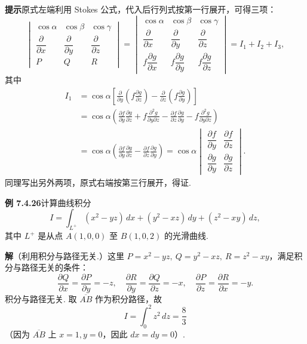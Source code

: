 \documentclass[UTF8,12pt,a4paper,fontset=fandol]{ctexart}
\begin{document}
\noindent\textbf{提示}\quad 原式左端利用 Stokes 公式，代入后行列式按第一行展开，可得三项：
\[
\begin{vmatrix}
\cos\alpha & \cos\beta & \cos\gamma\\
\dfrac{\partial}{\partial x} & \dfrac{\partial}{\partial y} & \dfrac{\partial}{\partial z}\\
P & Q & R
\end{vmatrix}
=
\begin{vmatrix}
\cos\alpha & \cos\beta & \cos\gamma\\
\dfrac{\partial}{\partial x} & \dfrac{\partial}{\partial y} & \dfrac{\partial}{\partial z}\\
f\dfrac{\partial g}{\partial x} & f\dfrac{\partial g}{\partial y} & f\dfrac{\partial g}{\partial z}
\end{vmatrix}
=I_1+I_2+I_3,
\]
其中
\[
\begin{aligned}
I_1&=\cos\alpha\left[\frac{\partial}{\partial y}\left(f\frac{\partial g}{\partial z}\right)
-\frac{\partial}{\partial z}\left(f\frac{\partial g}{\partial y}\right)\right]\\
&=\cos\alpha\left(\frac{\partial f}{\partial y}\frac{\partial g}{\partial z}
+f\frac{\partial^2g}{\partial y\partial z}
-\frac{\partial f}{\partial z}\frac{\partial g}{\partial y}
-f\frac{\partial^2g}{\partial y\partial z}\right)\\
&=\cos\alpha\left(\frac{\partial f}{\partial y}\frac{\partial g}{\partial z}
-\frac{\partial f}{\partial z}\frac{\partial g}{\partial y}\right)
=\cos\alpha
\begin{vmatrix}
\dfrac{\partial f}{\partial y} & \dfrac{\partial f}{\partial z}\\
\dfrac{\partial g}{\partial y} & \dfrac{\partial g}{\partial z}
\end{vmatrix}.
\end{aligned}
\]
同理写出另外两项，原式右端按第三行展开，得证.

\noindent\textbf{例 7.4.26}\quad 计算曲线积分
\[
I=\int_{L^+}(x^2-yz)\,dx+(y^2-xz)\,dy+(z^2-xy)\,dz,
\]
其中 $L^+$ 是从点 $A(1,0,0)$ 至 $B(1,0,2)$ 的光滑曲线.

\noindent\textbf{解}\quad （利用积分与路径无关.）这里 $P=x^2-yz,\ Q=y^2-xz,\ R=z^2-xy$，满足积分与路径无关的条件：
\[
\frac{\partial Q}{\partial x}=\frac{\partial P}{\partial y}=-z,\quad
\frac{\partial R}{\partial y}=\frac{\partial Q}{\partial z}=-x,\quad
\frac{\partial P}{\partial z}=\frac{\partial R}{\partial x}=-y.
\]
积分与路径无关. 取 $\overline{AB}$ 作为积分路径，故
\[
I=\int_0^2z^2\,dz=\frac83
\]
（因为 $\overline{AB}$ 上 $x=1,y=0$，因此 $dx=dy=0$）.
\end{document}
